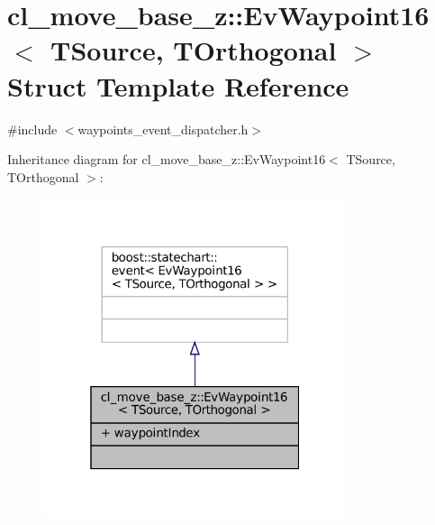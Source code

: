 \hypertarget{structcl__move__base__z_1_1EvWaypoint16}{}\section{cl\+\_\+move\+\_\+base\+\_\+z\+:\+:Ev\+Waypoint16$<$ T\+Source, T\+Orthogonal $>$ Struct Template Reference}
\label{structcl__move__base__z_1_1EvWaypoint16}


{\ttfamily \#include $<$waypoints\+\_\+event\+\_\+dispatcher.\+h$>$}



Inheritance diagram for cl\+\_\+move\+\_\+base\+\_\+z\+:\+:Ev\+Waypoint16$<$ T\+Source, T\+Orthogonal $>$\+:
\nopagebreak
\begin{figure}[H]
\begin{center}
\leavevmode
\includegraphics[width=253pt]{structcl__move__base__z_1_1EvWaypoint16__inherit__graph}
\end{center}
\end{figure}


